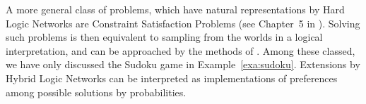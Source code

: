 



A more general class of problems, which have natural representations by Hard Logic Networks are Constraint Satisfaction Problems (see Chapter~5 in \cite{russell_artificial_2021}).
Solving such problems is then equivalent to sampling from the worlds in a logical interpretation, and can be approached by the methods of .
Among these classed, we have only discussed the Sudoku game in Example~\ref{exa:sudoku}.
Extensions by Hybrid Logic Networks can be interpreted as implementations of preferences among possible solutions by probabilities.